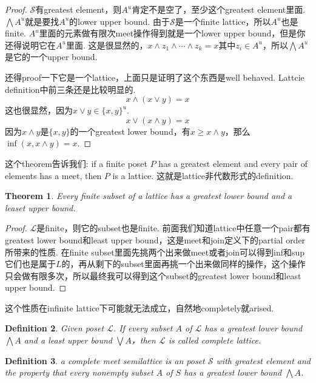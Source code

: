 \documentclass{article}
\newtheorem{theorem}{Theorem}[section]
\newtheorem{definition}[theorem]{Definition}
\newcommand\slattice{\mathcal{S}}
\newcommand\lattice{\mathcal{L}}
\begin{document}
\begin{proof}
$\slattice$有greatest element，则$A^u$肯定不是空了，至少这个greatest element里面. $\bigwedge A^u$就是要找$A^u$的lower upper bound. 由于$\slattice$是一个finite lattice，所以$A^u$也是finite. $A^u$里面的元素做有限次meet操作得到就是一个lower upper bound，但是你还得说明它在$A^u$里面. 这是很显然的，$x \wedge z_1 \wedge \cdots \wedge z_k = x$其中$z_i \in A^u$，所以$\bigwedge A^u$是它的一个upper bound.

还得proof一下它是一个lattice，上面只是证明了这个东西是well behaved. Lattcie definition中前三条还是比较明显的.
$$
x \wedge (x \vee y) = x
$$
这也很显然，因为$x \vee y \in \{x,y\}^u$.
$$
x \vee (x \wedge y) = x
$$
因为$x \wedge y$是$\{x,y\}$的一个greatest lower bound，有$x \geq x \wedge y$，那么$\inf(x,x \wedge y) = x$.
\end{proof}

这个theorem告诉我们: {\color{red} if a finite poset $P$ has a greatest element and every pair of elements has a meet,
then $P$ is a lattice}. 这就是lattice非代数形式的definition.

\begin{theorem}
\rm Every finite subset of a lattice has a greatest lower bound and a leaset upper bound.
\end{theorem}

\begin{proof}
$\lattice$是finite，则它的subset也是finite. 前面我们知道lattice中任意一个pair都有greatest lower bound和least upper bound，这是meet和join定义下的partial order所带来的性质. 在finite subset里面先挑两个出来做meet或者join可以得到inf和sup它们也是属于$L$的，再从剩下的subset里面再挑一个出来做同样的操作，这个操作只会做有限多次，所以最终我可以得到这个subset的greatest lower bound和least upper bound.
\end{proof}

{\color{red} 这个性质在infinite lattice下可能就无法成立，自然地completely就arised}.

\begin{definition}
\rm Given poset $\lattice$. If every subset $A$ of $\lattice$ has a greatest lower bound $\bigwedge A$ and a least upper bound $\bigvee A$，then $\lattice$ is called {\color{red} complete lattice}. 
\end{definition}


\begin{definition}
\rm a {\color{red} complete meet semilattice} is an poset $\slattice$ with greatest element and the property that every nonempty subset $A$ of $S$ has a greatest lower bound $\bigwedge A$.
\end{definition}
\end{document}
